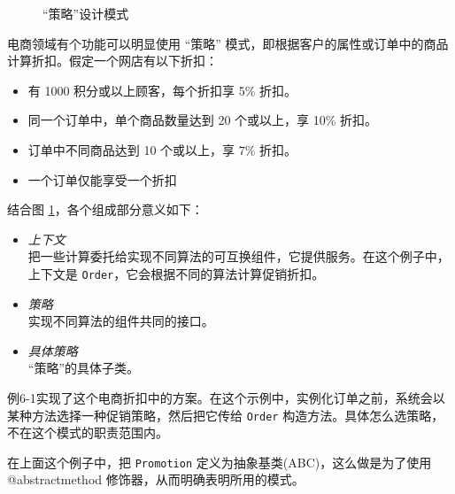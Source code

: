 \begin{figure}[H]
    \caption{``策略''设计模式}
    \label{fig:``策略''设计模式}
\end{figure}

电商领域有个功能可以明显使用 ``策略'' 模式，即根据客户的属性或订单中的商品计算折扣。假定一个网店有以下折扣：
\begin{itemize}
    \item 有 1000 积分或以上顾客，每个折扣享 5\% 折扣。
    \item 同一个订单中，单个商品数量达到 20 个或以上，享 10\% 折扣。
    \item 订单中不同商品达到 10 个或以上，享 7\% 折扣。
    \item 一个订单仅能享受一个折扣
\end{itemize}

结合图 \ref{fig:``策略''设计模式}，各个组成部分意义如下：
\begin{itemize}
    \item \textit{上下文} \\
    把一些计算委托给实现不同算法的可互换组件，它提供服务。在这个例子中，上下文是 \texttt{Order}，它会根据不同的算法计算促销折扣。
    \item \textit{策略} \\
    实现不同算法的组件共同的接口。
    \item \textit{具体策略} \\
    ``策略''的具体子类。
\end{itemize}

例6-1实现了这个电商折扣中的方案。在这个示例中，实例化订单之前，系统会以某种方法选择一种促销策略，然后把它传给 \texttt{Order} 构造方法。具体怎么选策略，不在这个模式的职责范围内。



在上面这个例子中，把 \texttt{Promotion} 定义为抽象基类(ABC)，这么做是为了使用 @abstractmethod 修饰器，从而明确表明所用的模式。

